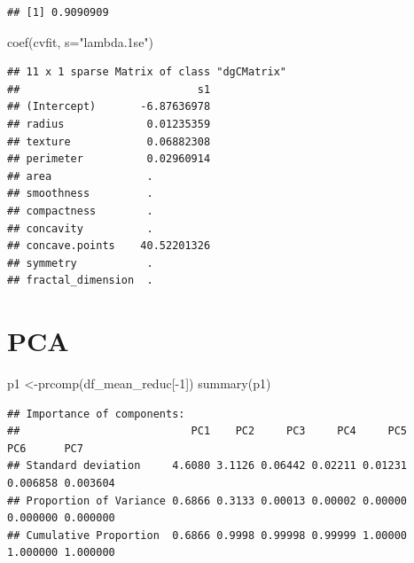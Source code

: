 \documentclass[
  11pt,
]{article}
\newenvironment{Shaded}{\begin{snugshade}}{\end{snugshade}}
\newcommand{\AttributeTok}[1]{\textcolor[rgb]{0.77,0.63,0.00}{#1}}
\newcommand{\DecValTok}[1]{\textcolor[rgb]{0.00,0.00,0.81}{#1}}
\newcommand{\FunctionTok}[1]{\textcolor[rgb]{0.00,0.00,0.00}{#1}}
\newcommand{\NormalTok}[1]{#1}
\newcommand{\OtherTok}[1]{\textcolor[rgb]{0.56,0.35,0.01}{#1}}
\newcommand{\SpecialCharTok}[1]{\textcolor[rgb]{0.00,0.00,0.00}{#1}}
\newcommand{\StringTok}[1]{\textcolor[rgb]{0.31,0.60,0.02}{#1}}
\begin{document}
\begin{Shaded}
\end{Shaded}

\begin{verbatim}
## [1] 0.9090909
\end{verbatim}

\begin{Shaded}
\begin{Highlighting}[]
\FunctionTok{coef}\NormalTok{(cvfit, }\AttributeTok{s=}\StringTok{"lambda.1se"}\NormalTok{)}
\end{Highlighting}
\end{Shaded}

\begin{verbatim}
## 11 x 1 sparse Matrix of class "dgCMatrix"
##                            s1
## (Intercept)       -6.87636978
## radius             0.01235359
## texture            0.06882308
## perimeter          0.02960914
## area               .         
## smoothness         .         
## compactness        .         
## concavity          .         
## concave.points    40.52201326
## symmetry           .         
## fractal_dimension  .
\end{verbatim}

\hypertarget{pca}{%
\section{PCA}\label{pca}}

\begin{Shaded}
\begin{Highlighting}[]
\NormalTok{p1 }\OtherTok{\textless{}{-}}\FunctionTok{prcomp}\NormalTok{(df\_mean\_reduc[}\SpecialCharTok{{-}}\DecValTok{1}\NormalTok{])}
\FunctionTok{summary}\NormalTok{(p1)}
\end{Highlighting}
\end{Shaded}

\begin{verbatim}
## Importance of components:
##                           PC1    PC2     PC3     PC4     PC5      PC6      PC7
## Standard deviation     4.6080 3.1126 0.06442 0.02211 0.01231 0.006858 0.003604
## Proportion of Variance 0.6866 0.3133 0.00013 0.00002 0.00000 0.000000 0.000000
## Cumulative Proportion  0.6866 0.9998 0.99998 0.99999 1.00000 1.000000 1.000000
\end{verbatim}
\end{document}
